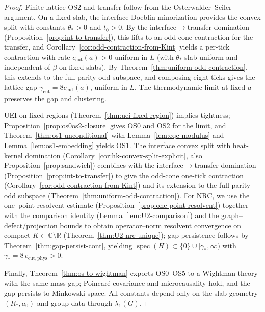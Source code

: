 \documentclass[11pt]{amsart}
\theoremstyle{plain}
\theoremstyle{definition}
\theoremstyle{remark}
\begin{document}
\begin{proof}
Finite-lattice OS2 and transfer follow from the Osterwalder--Seiler argument. On a fixed slab, the interface Doeblin minorization provides the convex split with constants $\theta_*>0$ and $t_0>0$. By the interface$\to$transfer domination (Proposition~\ref{prop:int-to-transfer}), this lifts to an odd-cone contraction for the transfer, and Corollary~\ref{cor:odd-contraction-from-Kint} yields a per-tick contraction with rate $c_{\mathrm{cut}}(a)>0$ uniform in $L$ (with $\theta_*$ slab-uniform and independent of $\beta$ on fixed slabs). By Theorem~\ref{thm:uniform-odd-contraction}, this extends to the full parity-odd subspace, and composing eight ticks gives the lattice gap $\gamma_{\mathrm{cut}}=8 c_{\mathrm{cut}}(a)$, uniform in $L$. The thermodynamic limit at fixed $a$ preserves the gap and clustering.

UEI on fixed regions (Theorem~\ref{thm:uei-fixed-region}) implies tightness; Proposition~\ref{prop:os0os2-closure} gives OS0 and OS2 for the limit, and Theorem~\ref{thm:os1-unconditional} with Lemma~\ref{lem:eqc-modulus} and Lemma~\ref{lem:os1-embedding} yields OS1. The interface convex split with heat-kernel domination (Corollary~\ref{cor:hk-convex-split-explicit}, also Proposition~\ref{prop:sandwich}) combines with the interface$\to$transfer domination (Proposition~\ref{prop:int-to-transfer}) to give the odd-cone one-tick contraction (Corollary~\ref{cor:odd-contraction-from-Kint}) and its extension to the full parity-odd subspace (Theorem~\ref{thm:uniform-odd-contraction}). For NRC, we use the one–point resolvent estimate (Proposition~\ref{prop:one-point-resolvent}) together with the comparison identity (Lemma~\ref{lem:U2-comparison}) and the graph–defect/projection bounds to obtain operator–norm resolvent convergence on compact $K\subset\mathbb C\setminus\mathbb R$ (Theorem~\ref{thm:U2-nrc-unique}); gap persistence follows by Theorem~\ref{thm:gap-persist-cont}, yielding $\operatorname{spec}(H)\subset\{0\}\cup[\gamma_*,\infty)$ with $\gamma_*=8\,c_{\mathrm{cut,phys}}>0$.

Finally, Theorem~\ref{thm:os-to-wightman} exports OS0--OS5 to a Wightman theory with the same mass gap; Poincar\'e covariance and microcausality hold, and the gap persists to Minkowski space. All constants depend only on the slab geometry $(R_*,a_0)$ and group data through $\lambda_1(G)$.
\end{proof}
\end{document}
